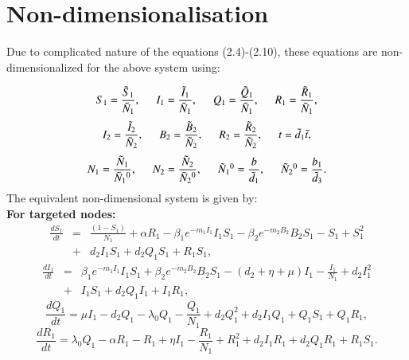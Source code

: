 \section{Non-dimensionalisation}
Due to complicated nature of the equations (2.4)-(2.10), these equations are non-dimensionalized for the above system using:

\begin{equation*}
S_1=\frac{ \tilde S_1}{ \tilde N_1}, \hspace{0.5 cm} I_1=\frac{ \tilde I_1}{ \tilde N_1}, \hspace{0.5 cm} Q_1=\frac{ \tilde Q_1}{ \tilde N_1}, \hspace{0.5 cm}
R_1=\frac{ \tilde R_1}{\tilde N_1},\end{equation*}
\begin{equation*}I_2=\frac{ \tilde I_2}{\tilde N_2},  \hspace{0.5 cm} B_2=\frac{\tilde B_2}{\tilde N_2},  \hspace{0.5 cm} R_2=\frac{\tilde R_2}{\tilde N_2}, \hspace{0.5 cm} t=\tilde d_1 \tilde t,\end{equation*}
\begin{equation} N_1=\frac{\tilde N_1}{ \tilde N_1\textsuperscript{0}},  \hspace{0.5 cm} N_2=\frac{\tilde N_2}{ \tilde N_2\textsuperscript{0}},  \hspace{0.5 cm} \tilde N_1\textsuperscript{0}=\frac{b}{\tilde d_1},  \hspace{0.5 cm} \tilde N_2\textsuperscript{0}=\frac{b_1}{\tilde d_3}.
\end{equation}
The equivalent non-dimensional system is given by:\\
{\bf For targeted nodes:}
\begin{eqnarray}
\frac{d S_1}{dt} &=& \frac{( 1- S_1)}{N_1}+ \alpha R_1 - \beta_1 e^{-m_1 I_1} I_1 S_1- \beta_2 e^{-m_2 B_2} B_2 S_1-S_1+S_1^2 \nonumber \\
&+& d_2 I_1 S_1+d_2 Q_1 S_1+R_1 S_1,
\end{eqnarray}
\begin{eqnarray}
\frac{d I_1}{dt}&=& \beta_1 e^{-m_1 I_1} I_1 S_1 +\beta_2 e^{-m_2 B_2} B_2 S_1 - ( d_2+ \eta + \mu) I_1- \frac{ I_1}{N_1}+d_2 I_1^2 \nonumber\\
&+& I_1 S_1+d_2 Q_1 I_1+I_1 R_1,
\end{eqnarray}
\begin{equation}
\frac{d Q_1}{dt}= \mu I_1 - d_2 Q_1 - \lambda_0 Q_1- \frac{ Q_1}{N_1}+d_2 Q_1^2+d_2 I_1 Q_1+ Q_1 S_1+Q_1 R_1,
\end{equation}
\begin{equation}
\frac{d R_1}{dt}=\lambda_0 Q_1- \alpha R_1- R_1+ \eta I_1- \frac{ R_1}{N_1}+R_1^2+d_2 I_1 R_1+d_2 Q_1 R_1+R_1 S_1 .
\end{equation}

